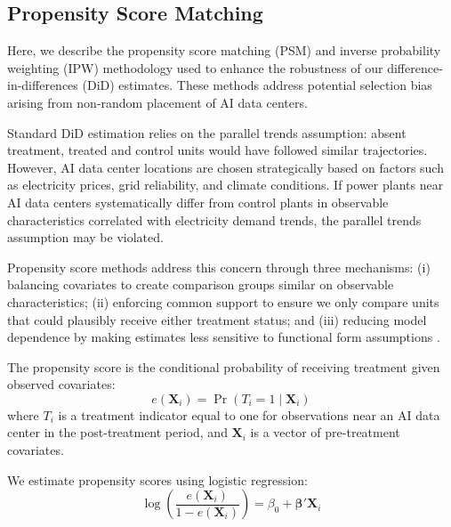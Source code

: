 \documentclass[sigconf,authordraft]{acmart}
\begin{document}

\subsection{Propensity Score Matching}\label{APP:PSM}

Here, we describe the propensity score matching (PSM) and inverse probability weighting (IPW) methodology used to enhance the robustness of our difference-in-differences (DiD) estimates. These methods address potential selection bias arising from non-random placement of AI data centers.

Standard DiD estimation relies on the parallel trends assumption: absent treatment, treated and control units would have followed similar trajectories. However, AI data center locations are chosen strategically based on factors such as electricity prices, grid reliability, and climate conditions. If power plants near AI data centers systematically differ from control plants in observable characteristics correlated with electricity demand trends, the parallel trends assumption may be violated.

Propensity score methods address this concern through three mechanisms: (i) balancing covariates to create comparison groups similar on observable characteristics; (ii) enforcing common support to ensure we only compare units that could plausibly receive either treatment status; and (iii) reducing model dependence by making estimates less sensitive to functional form assumptions \citep{rosenbaum1983central, hirano2003efficient}.

The propensity score is the conditional probability of receiving treatment given observed covariates:
\begin{equation}
    e(\mathbf{X}_i) = \Pr(T_i = 1 \mid \mathbf{X}_i)
\end{equation}
where $T_i$ is a treatment indicator equal to one for observations near an AI data center in the post-treatment period, and $\mathbf{X}_i$ is a vector of pre-treatment covariates.

We estimate propensity scores using logistic regression:
\begin{equation}
    \log\left(\frac{e(\mathbf{X}_i)}{1 - e(\mathbf{X}_i)}\right) = \beta_0 + \boldsymbol{\beta}'\mathbf{X}_i
\end{equation}
\end{document}
